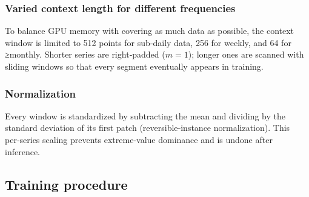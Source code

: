 \subsubsection{Varied context length for different frequencies}

To balance GPU memory with covering as much data as possible, the context window is limited to 512 points for sub‑daily data, 256 for weekly, and 64 for ≥monthly. Shorter series are right‑padded ($m = 1$); longer ones are scanned with sliding windows so that every segment eventually appears in training.

\subsubsection{Normalization}

Every window is standardized by subtracting the mean and dividing by the standard deviation of its first patch (reversible‑instance normalization).  This per‑series scaling prevents extreme‑value dominance and is undone after inference.


\subsection{Training procedure}